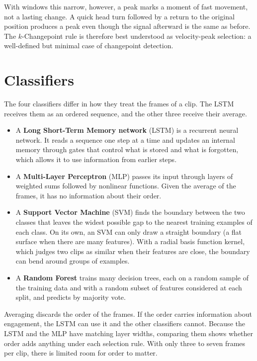 With windows this narrow, however, a peak marks a moment of fast movement, not a lasting change. A quick head turn followed by a return to the original position produces a peak even though the signal afterward is the same as before. The $k$-Changepoint rule is therefore best understood as velocity-peak selection: a well-defined but minimal case of changepoint detection.



\section{Classifiers}
\label{sec:classifiers}

The four classifiers differ in how they treat the frames of a clip. The LSTM receives them as an ordered sequence, and the other three receive their average.

\begin{itemize}
   \item A \textbf{Long Short-Term Memory network} (LSTM) \cite{hochreiter1997} is a recurrent neural network. It reads a sequence one step at a time and updates an internal memory through gates that control what is stored and what is forgotten, which allows it to use information from earlier steps.
   \item A \textbf{Multi-Layer Perceptron} (MLP) passes its input through layers of weighted sums followed by nonlinear functions. Given the average of the frames, it has no information about their order.
   \item A \textbf{Support Vector Machine} (SVM) \cite{cortes1995} finds the boundary between the two classes that leaves the widest possible gap to the nearest training examples of each class. On its own, an SVM can only draw a straight boundary (a flat surface when there are many features). With a radial basis function kernel, which judges two clips as similar when their features are close, the boundary can bend around groups of examples.
   \item A \textbf{Random Forest} \cite{breiman2001} trains many decision trees, each on a random sample of the training data and with a random subset of features considered at each split, and predicts by majority vote.
\end{itemize}

Averaging discards the order of the frames. If the order carries information about engagement, the LSTM can use it and the other classifiers cannot. Because the LSTM and the MLP have matching layer widths, comparing them shows whether order adds anything under each selection rule. With only three to seven frames per clip, there is limited room for order to matter.


